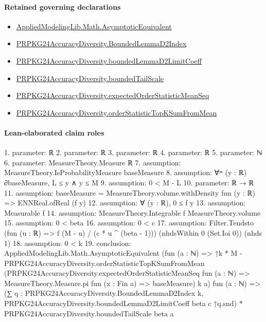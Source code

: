 \documentclass[10pt]{article}
\begin{document}
\paragraph{Retained governing declarations}
\begin{itemize}\raggedright
\item \hyperlink{governing-declaration-4f7a9039c890ef63}{Applied\allowbreak{}Modeling\allowbreak{}Lib.\allowbreak{}Math.\allowbreak{}Asymptotic\allowbreak{}Equivalent}
\item \hyperlink{governing-declaration-68b4c8874d9fb601}{PRPKG24\allowbreak{}Accuracy\allowbreak{}Diversity.\allowbreak{}Bounded\allowbreak{}Lemma\allowbreak{}D2\allowbreak{}Index}
\item \hyperlink{governing-declaration-0e195936b6402fb1}{PRPKG24\allowbreak{}Accuracy\allowbreak{}Diversity.\allowbreak{}bounded\allowbreak{}Lemma\allowbreak{}D2\allowbreak{}Limit\allowbreak{}Coeff}
\item \hyperlink{governing-declaration-3d6778643ef28d4a}{PRPKG24\allowbreak{}Accuracy\allowbreak{}Diversity.\allowbreak{}bounded\allowbreak{}Tail\allowbreak{}Scale}
\item \hyperlink{governing-declaration-9ae5c6cf4ac37116}{PRPKG24\allowbreak{}Accuracy\allowbreak{}Diversity.\allowbreak{}expected\allowbreak{}Order\allowbreak{}Statistic\allowbreak{}Mean\allowbreak{}Seq}
\item \hyperlink{governing-declaration-114633cb2285aabe}{PRPKG24\allowbreak{}Accuracy\allowbreak{}Diversity.\allowbreak{}order\allowbreak{}Statistic\allowbreak{}Top\allowbreak{}K\allowbreak{}Sum\allowbreak{}From\allowbreak{}Mean}
\end{itemize}
\paragraph{Lean-elaborated claim roles}\begin{ReviewVerbatim}
1. parameter: ℝ
2. parameter: ℝ
3. parameter: ℝ
4. parameter: ℝ
5. parameter: ℕ
6. parameter: MeasureTheory.Measure ℝ
7. assumption: MeasureTheory.IsProbabilityMeasure baseMeasure
8. assumption: ∀ᵐ (y : ℝ) ∂baseMeasure, L ≤ y ∧ y ≤ M
9. assumption: 0 < M - L
10. parameter: ℝ → ℝ
11. assumption: baseMeasure = MeasureTheory.volume.withDensity fun (y : ℝ) => ENNReal.ofReal (f y)
12. assumption: ∀ (y : ℝ), 0 ≤ f y
13. assumption: Measurable f
14. assumption: MeasureTheory.Integrable f MeasureTheory.volume
15. assumption: 0 < beta
16. assumption: 0 < c
17. assumption: Filter.Tendsto (fun (u : ℝ) => f (M - u) / (c * u ^ (beta - 1))) (nhdsWithin 0 (Set.Ioi 0)) (nhds 1)
18. assumption: 0 < k
19. conclusion: AppliedModelingLib.Math.AsymptoticEquivalent
  (fun (a : ℕ) =>
    ↑k * M -
      PRPKG24AccuracyDiversity.orderStatisticTopKSumFromMean
        (PRPKG24AccuracyDiversity.expectedOrderStatisticMeanSeq fun (a : ℕ) =>
          MeasureTheory.Measure.pi fun (x : Fin a) => baseMeasure)
        k a)
  fun (a : ℕ) =>
  (∑ q : PRPKG24AccuracyDiversity.BoundedLemmaD2Index k,
      PRPKG24AccuracyDiversity.boundedLemmaD2LimitCoeff beta c ↑q.snd) *
    PRPKG24AccuracyDiversity.boundedTailScale beta a
\end{ReviewVerbatim}
\end{document}
